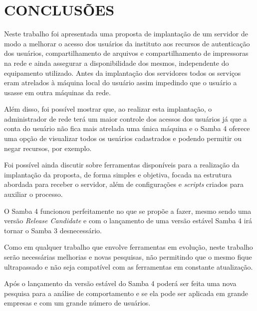 \chapter{CONCLUSÕES}

Neste trabalho foi apresentada uma proposta de implantação de um servidor de modo a melhorar o acesso dos usuários da instituto aos recursos de autenticação dos usuários, compartilhamento de arquivos e compartilhamento de impressoras na rede e ainda assegurar a disponibilidade dos mesmos, independente do equipamento utilizado. Antes da implantação dos servidores todos os serviços eram atrelados à máquina local do usuário assim impedindo que o usuário a usasse em outra máquinas da rede.

Além disso, foi possível mostrar que, ao realizar esta implantação, o administrador de rede terá um maior controle dos acessos dos usuários já que a conta do usuário não fica mais atrelada uma única máquina e o Samba 4 oferece uma opção de visualizar todos os usuários cadastrados e podendo permitir ou negar recursos, por exemplo.

Foi possível ainda discutir sobre ferramentas disponíveis para a realização da implantação da proposta, de forma simples e objetiva, focada na estrutura abordada para receber o servidor, além de configurações e \textit{scripts} criados para auxiliar o processo.


O Samba 4 funcionou perfeitamente no que se propõe a fazer, mesmo sendo uma versão \textit{Release Candidate} e com o lançamento de uma versão estável Samba 4 irá tornar o Samba 3 desnecessário.


Como em qualquer trabalho que envolve ferramentas em evolução, neste trabalho serão necessárias melhorias e novas pesquisas, não permitindo que o mesmo fique ultrapassado e não seja compatível com as ferramentas em constante atualização.

Após o lançamento da versão estável do Samba 4 poderá ser feita uma nova pesquisa para a análise de comportamento e se ela pode ser aplicada em grande empresas e com um grande número de usuários.



